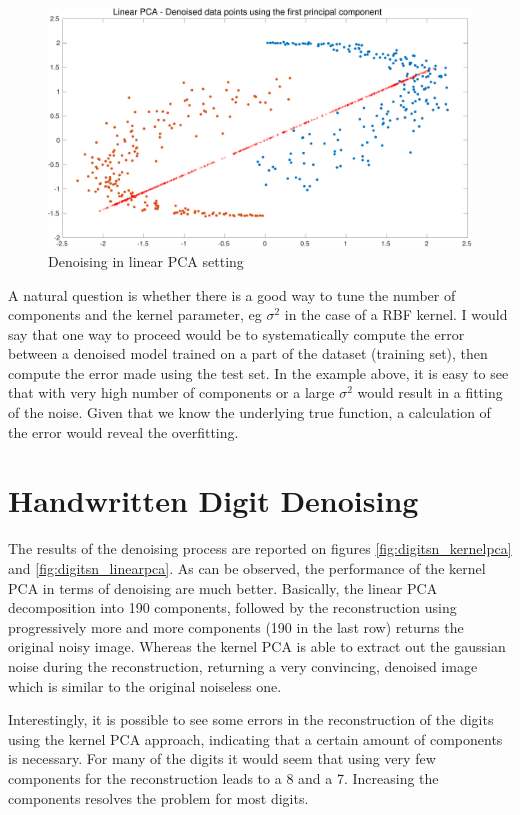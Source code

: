 \documentclass[11pt, a4paper]{article}
\begin{document}
\begin{figure}[H]
  \centering
  \includegraphics[scale=.30]{kpca_linear.pdf}
  \caption{Denoising in linear PCA setting}
  \label{fig:kpca_linear}
\end{figure}

A natural question is whether there is a good way to tune the number
of components and the kernel parameter, eg $\sigma^2$ in the case of a
RBF kernel. I would say that one way to proceed would be to
systematically compute the error between a denoised model trained on a
part of the dataset (training set), then compute the error made using
the test set. In the example above, it is easy to see that with very
high number of components or a large $\sigma^2$ would result in a
fitting of the noise. Given that we know the underlying true function,
a calculation of the error would reveal the overfitting.

\newpage
\section{Handwritten Digit Denoising}

The results of the denoising process are reported on figures
\ref{fig:digitsn_kernelpca} and \ref{fig:digitsn_linearpca}. As can be
observed, the performance of the kernel PCA in terms of denoising are
much better. Basically, the linear PCA decomposition into 190
components, followed by the reconstruction using progressively more
and more components (190 in the last row) returns the original noisy
image. Whereas the kernel PCA is able to extract out the gaussian
noise during the reconstruction, returning a very convincing, denoised
image which is similar to the original noiseless one.

Interestingly, it is possible to see some errors in the reconstruction
of the digits using the kernel PCA approach, indicating that a certain
amount of components is necessary. For many of the digits it would
seem that using very few components for the reconstruction leads to a
8 and a 7. Increasing the components resolves the problem for most
digits.
\end{document}
